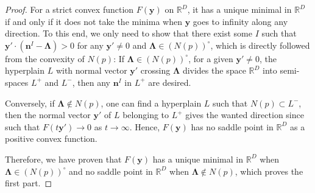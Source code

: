 \documentclass[12pt]{article}
\theoremstyle{definition}
\theoremstyle{plain}
\begin{document}
\begin{proof}
	For a strict convex function $F(\mathbf y)$ on $\mathbb R^D$, it has a unique minimal in $\mathbb R^D$ 
	if and only if it does not take the minima when $\mathbf{y}$ goes to infinity along any direction. 
	To this end, we only need to show that there exist some $I$ such that $\mathbf{y}'\cdot (\mathbf{n}^I-\mathbf{\Lambda})>0$ for any $\mathbf{y}'\neq 0$ and $\mathbf\Lambda \in (N(p))^\circ $, which is directly followed from the convexity of $N(p)$: If $\mathbf\Lambda \in (N(p))^\circ$, for a given $\mathbf{y}'\neq 0$, the hyperplain $L$ with normal vector $\mathbf{y}'$ crossing $\mathbf \Lambda$ 
	divides the space $\mathds{R}^{D}$ into semi-spaces $L^+$ and $L^-$, then any $\mathbf{n}^I$ 
	in $L^+$ are desired.

	
	\begin{center}
	\end{center}
	Conversely, if $\mathbf\Lambda \not\in N(p)$, one can find a hyperplain $L$ such that $N(p)\subset L^-$, 
	then the normal vector $\mathbf{y}'$ of $L$ belonging to $L^{+}$ gives the wanted direction since such that $F(t\mathbf{y}')\to 0$ as $t\to \infty$. Hence, $F(\mathbf y)$ has no saddle point in $\mathds{R}^D$ as a positive convex function.
	
	Therefore, we have proven that $F(\mathbf y)$ has a unique minimal in $\mathbb R^D$ when 
	$\mathbf \Lambda \in (N(p))^\circ$ and no saddle point in $\mathbb R^D$ when 
	$\mathbf \Lambda \not\in N(p)$, which proves the first part.
	

\end{proof}
\end{document}
